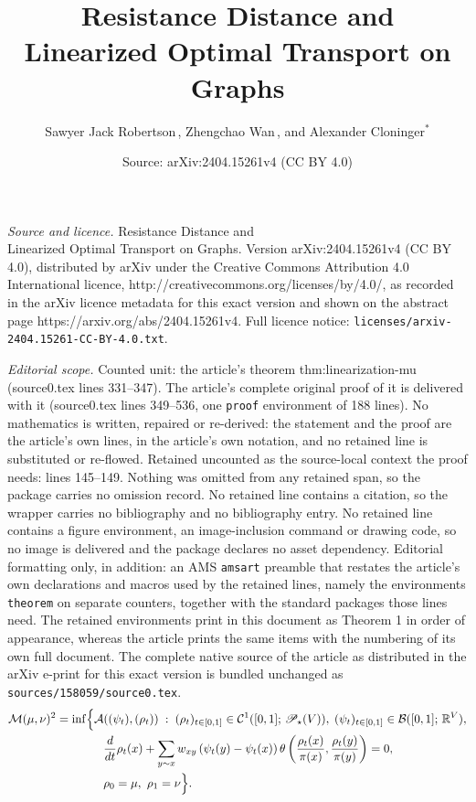 \documentclass[10pt,a4paper]{amsart}
\title{Resistance Distance and \\ Linearized Optimal Transport on Graphs}
\author{Sawyer Jack Robertson\,, Zhengchao Wan\,, and Alexander Cloninger${}^\ast{}$}
\date{Source: arXiv:2404.15261v4 (CC BY 4.0)}
\newcommand{\Maas}{\mathcal{M}}
\newcommand{\Prob}{\mathscr{P}}
\begin{document}
\maketitle

\noindent\emph{Source and licence.} Resistance Distance and \\ Linearized Optimal Transport on Graphs. Version arXiv:2404.15261v4 (CC BY 4.0), distributed by arXiv under the Creative Commons Attribution 4.0 International licence, http://creativecommons.org/licenses/by/4.0/, as recorded in the arXiv licence metadata for this exact version and shown on the abstract page https://arxiv.org/abs/2404.15261v4. Full licence notice: \texttt{licenses/arxiv-2404.15261-CC-BY-4.0.txt}.\par\smallskip

\noindent\textit{Editorial scope.} Counted unit: the article's theorem thm:linearization-mu (source0.tex lines 331--347). The article's complete original proof of it is delivered with it (source0.tex lines 349--536, one \texttt{proof} environment of 188 lines). No mathematics is written, repaired or re-derived: the statement and the proof are the article's own lines, in the article's own notation, and no retained line is substituted or re-flowed.  Retained uncounted as the source-local context the proof needs: lines 145--149.  Nothing was omitted from any retained span, so the package carries no omission record.  No retained line contains a citation, so the wrapper carries no bibliography and no bibliography entry.  No retained line contains a figure environment, an image-inclusion command or drawing code, so no image is delivered and the package declares no asset dependency.  Editorial formatting only, in addition: an AMS \texttt{amsart} preamble that restates the article's own declarations and macros used by the retained lines, namely the environments \texttt{theorem} on separate counters, together with the standard packages those lines need.  The retained environments print in this document as Theorem 1 in order of appearance, whereas the article prints the same items with the numbering of its own full document.  The complete native source of the article as distributed in the arXiv e-print for this exact version is bundled unchanged as \texttt{sources/158059/source0.tex}.
        \begin{align}\label{eq:defn-maas-distance}
            \Maas (\mu,\nu)^2 &= \inf\Bigl\{ \mathcal{A}((\psi_t), (\rho_t)) \;:\; (\rho_t)_{t\in[0,1]}\in \mathcal{C}^{1}([0, 1];\,\Prob_\star(V)),\; (\psi_t)_{t\in[0,1]}\in \mathcal{B}([0, 1];\,\mathbb{R}^{V}),\notag\\
            &\qquad\qquad \frac{d}{dt}\rho_t(x) + \sum_{y\sim x} w_{xy}\, (\psi_t(y) - \psi_t(x))\, \theta\left(\frac{\rho_t(x)}{\pi(x)}, \frac{\rho_t(y)}{\pi(y)}\right) = 0,\notag\\
            &\qquad\qquad \rho_0 = \mu,\ \rho_1 = \nu \Bigr\}.
        \end{align}
\end{document}
